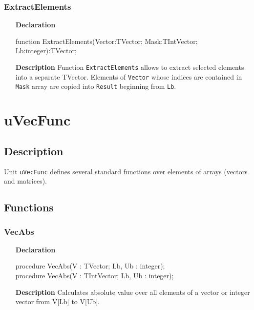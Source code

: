 \documentclass[12pt,a4paper,oneside]{report}
\newcommand{\lmatha}[1]{   %
	\marginpar{\vspace{#1} 
		\begin{flushright}
			LMath 0.5
	\end{flushright} }
}
\newcommand{\declarationitem}[1]{\textbf{#1}}
\newcommand{\descriptiontitle}[1]{\textbf{#1}}
\newcommand{\code}[1]{\texttt{#1}}
\begin{document}
\subsubsection{ExtractElements}
\label{uvecutils:extractelements}
\begin{itemize}
	\item[\declarationitem{Declaration}\hfill]
	\begin{flushleft}
		function ExtractElements(Vector:TVector; Mask:TIntVector; Lb:integer):TVector;
	\end{flushleft}
	\item[\descriptiontitle{Description}\hfill]
	Function \code{ExtractElements} allows to extract selected elements into a separate TVector. Elements of \code{Vector} whose indices are contained in \code{Mask} array are copied into \code{Result} beginning from \code{Lb}.
\end{itemize}

\section{uVecFunc}\label{sec:uvecfunc}\lmatha{-28pt}
\subsection{Description}
Unit \code{uVecFunc} defines several standard functions over elements of arrays (vectors and matrices).
\subsection{Functions} 
\subsubsection{VecAbs}
\label{uvecfunc:VecAbs}
\begin{itemize}
	\item[\declarationitem{Declaration}\hfill]
	\begin{flushleft}
procedure VecAbs(V : TVector; Lb, Ub : integer);\\ \vspace{4pt}	
procedure VecAbs(V : TIntVector; Lb, Ub : integer);
	\end{flushleft}
	\item[\descriptiontitle{Description}\hfill]
	Calculates absolute value over all elements of a vector or integer vector from V[Lb] to V[Ub].
\end{itemize}
\end{document}
